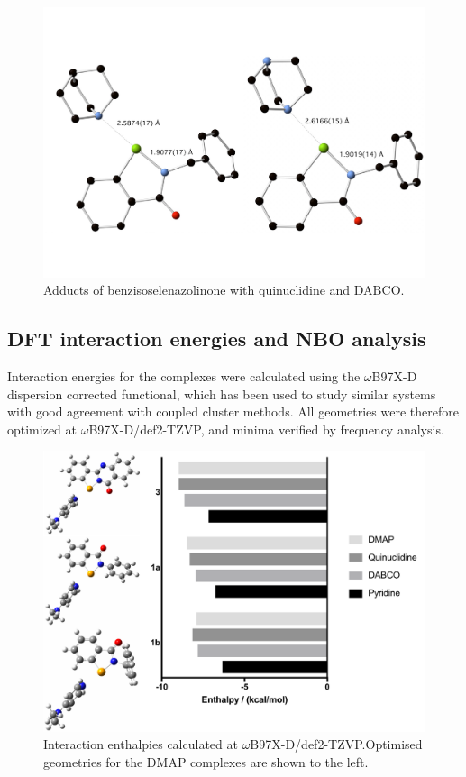 \begin{refsection}
\begin{figure}
  \centering
  \includegraphics[width=0.8\linewidth]{Figures/benzyl-quin-dabco-xray.pdf}
  \caption{Adducts of benzisoselenazolinone  with quinuclidine and DABCO.}\label{fig:benzyl-adducts}
\end{figure}

\subsection{DFT interaction energies and NBO analysis}
Interaction energies for the complexes were calculated using the $ \omega $B97X-D dispersion corrected functional, which has been used to study similar systems with good agreement with coupled cluster methods.\autocite{Oliveira2017}
All geometries were therefore optimized at $ \omega $B97X-D/def2-TZVP, and minima verified by frequency analysis.

\begin{figure}
  \centering
  \includegraphics[width=0.8\linewidth]{Figures/dft-energies.pdf}
  \caption[Interaction energies for various complexes.]{Interaction enthalpies calculated at $ \omega $B97X-D/def2-TZVP.\@ Optimised geometries for the DMAP complexes are shown to the left.}
\end{figure}


\end{refsection}
